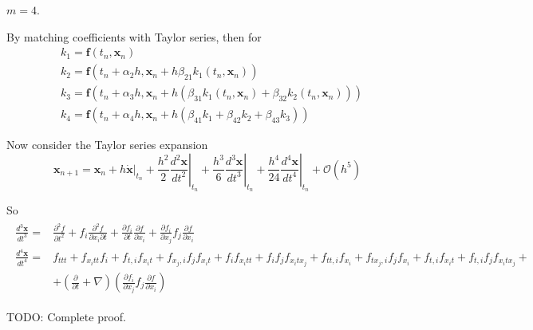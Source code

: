 \documentclass[10pt]{amsart}
\begin{document}
\begin{multicols*}{2}
$m=4$.

By matching coefficients with Taylor series, then for
\begin{equation}
	\begin{aligned}
		& k_1 = \mathbf{f}(t_n, \mathbf{x}_n) \\
		& k_2 = \mathbf{f}(t_n + \alpha_2 h, \mathbf{x}_n + h \beta_{21} k_1(t_n,\mathbf{x}_n)) \\
		& k_3 = \mathbf{f}(t_n + \alpha_3 h, \mathbf{x}_n +h (\beta_{31}k_1(t_n, \mathbf{x}_n) + \beta_{32}k_2(t_n, \mathbf{x}_n)) ) \\
		& k_4 = \mathbf{f}(t_n + \alpha_4 h, \mathbf{x}_n + h(\beta_{41} k_1 + \beta_{42} k_2 + \beta_{43} k_3))
	\end{aligned}
\end{equation}

Now consider the Taylor series expansion
\[
\mathbf{x}_{n+1} = \mathbf{x}_n + h \left. \dot{ \mathbf{x}} \right|_{t_n} + \frac{h^2}{2} \left. \frac{d^2 \mathbf{x}}{ dt^2} \right|_{t_n} + \frac{h^3}{6} \left. \frac{d^3 \mathbf{x}}{ dt^3} \right|_{t_n} + \frac{h^4}{24} \left. \frac{d^4 \mathbf{x}}{ dt^4} \right|_{t_n} + \mathcal{O}(h^5)
\]

So
\[
\begin{gathered}
\begin{aligned}
\frac{d^3 \mathbf{x}}{dt^3} = & \frac{\partial^2 f}{\partial t^2} + f_i \frac{ \partial^2 f}{ \partial x_i \partial t} + \frac{ \partial f_i}{\partial t} \frac{ \partial f}{\partial x_i} + \frac{\partial f_i}{\partial x_j} f_j \frac{\partial f}{\partial x_i}  \\
\frac{d^4 \mathbf{x}}{dt^4} = & f_{ttt} + f_{x_i tt}f_i + f_{t,i} f_{x_i t} + f_{x_j, i} f_j f_{x_i t} + f_i f_{x_i tt} + f_i f_j f_{x_i t  x_j} + f_{tt, i} f_{x_i} + f_{tx_j, i} f_j f_{x_i} + f_{t,i} f_{x_i t} + f_{t,i} f_j f_{x_i t x_j} + \\
& + \left(\frac{ \partial}{\partial t} + \nabla \right)\left( \frac{ \partial f_i}{\partial x_j} f_j \frac{ \partial f}{\partial x_i} \right)
\end{aligned}
\end{gathered}
\]

TODO: Complete proof.


\end{multicols*}
\end{document}
